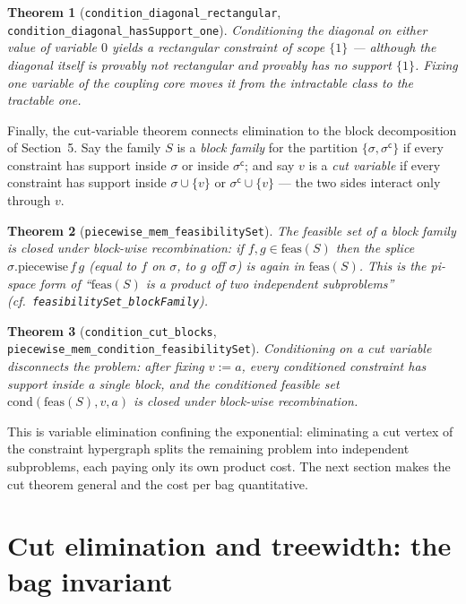 \documentclass[11pt]{article}
\newtheorem{theorem}{Theorem}
\newcommand{\lean}[1]{\texttt{#1}}
\newcommand{\feas}{\mathrm{feas}}
\begin{document}
\begin{theorem}[\lean{condition\_diagonal\_rectangular},
\lean{condition\_diagonal\_hasSupport\_one}]
Conditioning the diagonal on either value of variable $0$ yields a
\emph{rectangular} constraint of scope $\{1\}$ --- although the
diagonal itself is provably not rectangular and provably has no
support $\{1\}$.  Fixing one variable of the coupling core moves it
from the intractable class to the tractable one.
\end{theorem}

Finally, the cut-variable theorem connects elimination to the block
decomposition of Section~5.  Say the family $S$ is a \emph{block
family} for the partition $\{\sigma, \sigma^{\mathsf{c}}\}$ if every
constraint has support inside $\sigma$ or inside
$\sigma^{\mathsf{c}}$; and say $v$ is a \emph{cut variable} if every
constraint has support inside $\sigma \cup \{v\}$ or
$\sigma^{\mathsf{c}} \cup \{v\}$ --- the two sides interact only
through $v$.

\begin{theorem}[\lean{piecewise\_mem\_feasibilitySet}]
The feasible set of a block family is closed under block-wise
recombination: if $f, g \in \feas(S)$ then the splice
$\sigma.\mathrm{piecewise}\,f\,g$ (equal to $f$ on $\sigma$, to $g$
off $\sigma$) is again in $\feas(S)$.  This is the pi-space form of
``$\feas(S)$ is a product of two independent subproblems''
(cf.\ \lean{feasibilitySet\_blockFamily}).
\end{theorem}

\begin{theorem}[\lean{condition\_cut\_blocks},
\lean{piecewise\_mem\_condition\_feasibilitySet}]
Conditioning on a cut variable disconnects the problem: after fixing
$v := a$, every conditioned constraint has support inside a single
block, and the conditioned feasible set
$\mathrm{cond}(\feas(S), v, a)$ is closed under block-wise
recombination.
\end{theorem}

This is variable elimination confining the exponential: eliminating a
cut vertex of the constraint hypergraph splits the remaining problem
into independent subproblems, each paying only its own product cost.
The next section makes the cut theorem general and the cost per bag
quantitative.

\section{Cut elimination and treewidth: the bag invariant}
\end{document}
